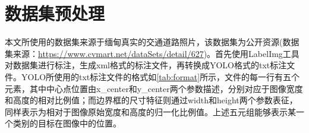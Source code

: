 

\section{数据集预处理}
本文所使用的数据集来源于缅甸真实的交通道路照片，该数据集为公开资源(数据集来源：\url{https://www.cvmart.net/dataSets/detail/627})。首先使用LabelImg工具对数据集进行标注，生成xml格式的标注文件，再转换成YOLO格式的txt标注文件。YOLO所使用的txt标注文件的格式如\ref{tab:format}所示，文件的每一行有五个元素，其中中心点位置由x\_center和y\_center两个参数描述，分别对应于图像宽度和高度的相对比例值；而边界框的尺寸特征则通过width和height两个参数表征，同样表示为相对于图像原始宽度和高度的归一化比例值。上述五元组能够表示某一个类别的目标在图像中的位置。

